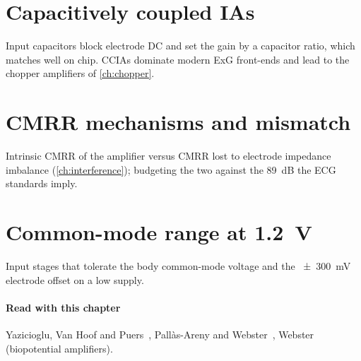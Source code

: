 \section{Capacitively coupled IAs}\label{sec:ch7-3}
Input capacitors block electrode DC and set the gain by a capacitor ratio, which matches well on chip. CCIAs dominate modern ExG front-ends and lead to the chopper amplifiers of \cref{ch:chopper}.

\section{CMRR mechanisms and mismatch}\label{sec:ch7-4}
Intrinsic CMRR of the amplifier versus CMRR lost to electrode impedance imbalance (\cref{ch:interference}); budgeting the two against the \qty{89}{\deci\bel} the ECG standards imply.

\section{Common-mode range at \texorpdfstring{\qty{1.2}{\volt}}{1.2 V}}\label{sec:ch7-5}
Input stages that tolerate the body common-mode voltage and the \qty{\pm 300}{\milli\volt} electrode offset on a low supply.

\paragraph{Read with this chapter} Yazicioglu, Van Hoof and Puers~\cite{yazicioglubook}, Pall\`as-Areny and Webster~\cite{pallas1991}, Webster~\cite{webster} (biopotential amplifiers).
